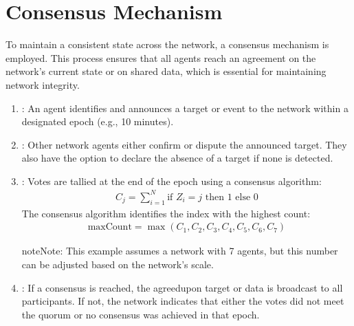 \documentclass[a4paper,10pt,english]{sphinxmanual}
\begin{document}
\section{Consensus Mechanism}
\label{\detokenize{introduction:consensus-mechanism}}
\sphinxAtStartPar
To maintain a consistent state across the network, a consensus mechanism is employed. This process ensures that all agents reach an agreement on the network’s current state or on shared data, which is essential for maintaining network integrity.
\begin{enumerate}
%
\item {} 
\sphinxAtStartPar
{}: An agent identifies and announces a target or event to the network within a designated epoch (e.g., 10 minutes).

\item {} 
\sphinxAtStartPar
{}: Other network agents either confirm or dispute the announced target. They also have the option to declare the absence of a target if none is detected.

\item {} 
\sphinxAtStartPar
{}: Votes are tallied at the end of the epoch using a consensus algorithm:
\begin{equation*}
\begin{split}C_j = \sum_{i=1}^{N} \text{if } Z_i = j \text{ then } 1 \text{ else } 0\end{split}
\end{equation*}
\sphinxAtStartPar
The consensus algorithm identifies the index with the highest count:
\begin{equation*}
\begin{split}\text{maxCount} = \max(C_1, C_2, C_3, C_4, C_5, C_6, C_7)\end{split}
\end{equation*}
\begin{sphinxadmonition}{note}{Note:}
\sphinxAtStartPar
{} This example assumes a network with 7 agents, but this number can be adjusted based on the network’s scale.
\end{sphinxadmonition}

\item {} 
\sphinxAtStartPar
{}: If a consensus is reached, the agreed\sphinxhyphen{}upon target or data is broadcast to all participants. If not, the network indicates that either the votes did not meet the quorum or no consensus was achieved in that epoch.

\end{enumerate}
\end{document}
